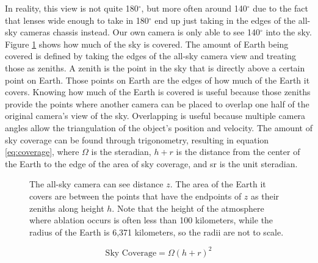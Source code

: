 In reality, this view is not quite 180$^{\circ}$, but more often around 140$^{\circ}$ due to the fact that lenses wide enough to take in 180$^{\circ}$ end up just taking in the edges of the all-sky cameras chassis instead. Our own camera is only able to see 140$^{\circ}$ into the sky. Figure \ref{fig:atmosphere} shows how much of the sky is covered. The amount of Earth being covered is defined by taking the edges of the all-sky camera view and treating those as zeniths. A zenith is the point in the sky that is directly above a certain point on Earth. Those points on Earth are the edges of how much of the Earth it covers. Knowing how much of the Earth is covered is useful because those zeniths provide the points where another camera can be placed to overlap one half of the original camera's view of the sky. Overlapping is useful because multiple camera angles allow the triangulation of the object's position and velocity. The amount of sky coverage can be found through trigonometry, resulting in equation \ref{eq:coverage}, where $\Omega$ is the steradian, $h+r$ is the distance from the center of the Earth to the edge of the area of sky coverage, and sr is the unit steradian.
\begin{figure}[ht!]
	\centering
	\caption{The all-sky camera can see distance $z$. The area of the Earth it covers are between the points that have the endpoints of $z$ as their zeniths along height $h$. Note that the height of the atmosphere where ablation occurs is often less than 100 kilometers, while the radius of the Earth is 6,371 kilometers, so the radii are not to scale.}
	\label{fig:atmosphere}
\end{figure}


\begin{equation} \label{eq:coverage}
	\textrm{Sky Coverage} = \Omega(h+r)^2
\end{equation}

